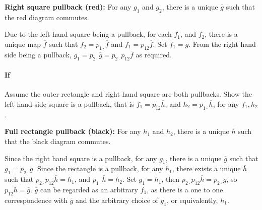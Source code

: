 \documentclass{article}
\begin{document}
\textbf{Right square pullback (red):}  For any $g_1$ and $g_2$, there is a unique $\overline{g}$ such that the red diagram commutes.

Due to the left hand square being a pullback, for each $f_1$, and $f_2$, there is a unique map $\overline{f}$ such that $f_2 = p_{1\cdot}\overline{f}$ and $f_1 = p_{12}\overline{f}$. Set $f_1 = \overline{g}$.   From the right hand side being a pullback,  $g_1 = p_{2\cdot}\overline{g}=p_{2\cdot}p_{12}\overline{f}$ as required.

\paragraph{If}

Assume the outer rectangle and right hand square are both pullbacks. Show the left hand side square is a pullback, that is $f_1 = p_{12}\overline{h}$, and $h_2=p_{1\cdot}\overline{h}$, for any $f_1,  h_2$.


\textbf{Full rectangle pullback (black):}  For any $h_1$ and $h_2$, there is a unique $\overline{h}$ such that the black diagram commutes.

Since the right hand square is a pullback, for any $g_1$, there is a unique $\overline{g}$ such that $g_1 = p_{2\cdot}\overline{g}$. Since the rectangle is a pullback, for any $h_1$, there exists a unique $\overline{h}$ such that $p_{2\cdot}p_{12}\overline{h} = h_1$, and $p_{1\cdot}\overline{h} = h_2$. Set $g_1=h_1$, then $p_{2\cdot}p_{12}\overline{h} = p_{2\cdot}\overline{g}$, so $p_{12}\overline{h} = \overline{g}$. $\overline{g}$ can be regarded as an arbitrary $f_1$, as there is a one to one correspondence with $\overline{g}$ and the arbitrary choice of $g_1$, or equivalently, $h_1$.
\end{document}
